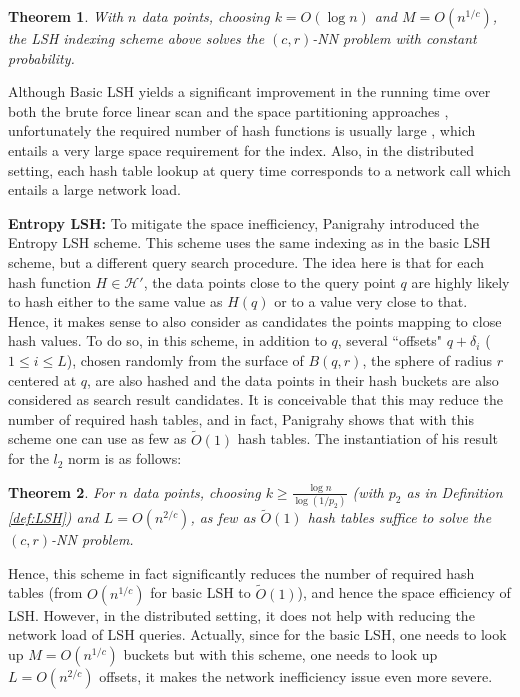 \documentclass{acm_proc_article-sp}
\numberwithin{equation}{section}
\numberwithin{figure}{section}
\newtheorem{thm}{Theorem}
\begin{document}
\begin{thm} With $n$ data points, choosing $k = O(\log{n})$ and $M = O(n^{1/c})$, the LSH indexing scheme above solves the $(c,r)$-NN problem with constant probability.
\end{thm}

Although Basic LSH yields a significant improvement in the running time over both the brute force linear scan and the space partitioning approaches \cite{expt:space:partitioning, Kakade:covertrees, Krauthgamer:lee:navigating:nets}, unfortunately the required number of hash functions is usually large \cite{Buhler, gim99}, which entails a very large space requirement for the index. Also, in the distributed setting, each hash table lookup at query time corresponds to a network call which entails a large network load.

\noindent \textbf{Entropy LSH: } To mitigate the space inefficiency, Panigrahy \cite{P06} introduced the Entropy LSH scheme. This scheme uses the same indexing as in the basic LSH scheme, but a different query search procedure. The idea here is that for each hash function $H\in \mathcal{H'}$, the data points close to the query point $q$ are highly likely to hash either to the same value as $H(q)$ or to a value very close to that. Hence, it makes sense to also consider as candidates the points mapping to close hash values. To do so, in this scheme, in addition to $q$, several ``offsets" $q+\delta_i$ ($1\leq i\leq L$), chosen randomly from the surface of $B(q,r)$, the sphere of radius $r$ centered at $q$, are also hashed and the data points in their hash buckets are also considered as search result candidates. It is conceivable that this may reduce the number of required hash tables, and in fact, Panigrahy \cite{P06} shows that with this scheme one can use as few as $\tilde{O}(1)$ hash tables. The instantiation of his result for the $l_2$ norm is as follows:

\begin{thm}
\label{thm:ELSH}
For $n$ data points, choosing $k\geq \frac{\log n}{\log (1/p_2)}$ (with $p_2$ as in Definition \ref{def:LSH}) and $L = O(n^{2/c})$, as few as $\tilde{O}(1)$ hash tables suffice to solve the $(c,r)$-NN problem.
\end{thm}

Hence, this scheme in fact significantly reduces the number of required hash tables (from $O(n^{1/c})$ for basic LSH to $\tilde{O}(1)$), and hence the space efficiency of LSH. However, in the distributed setting, it does not help with reducing the network load of LSH queries. Actually, since for the basic LSH, one needs to look up $M=O(n^{1/c})$ buckets but with this scheme, one needs to look up $L=O(n^{2/c})$ offsets, it makes the network inefficiency issue even more severe.
\end{document}
